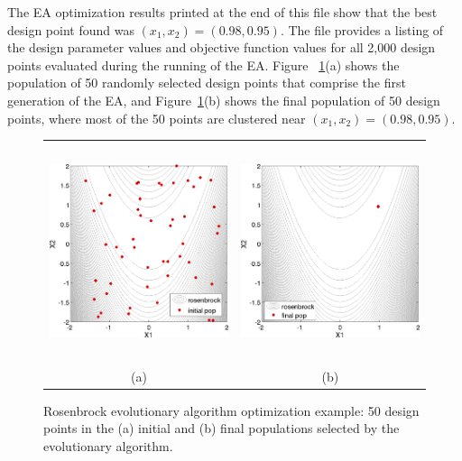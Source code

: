 The EA optimization results printed at the end of this file show that
the best design point found was $(x_1,x_2) = (0.98,0.95)$. The file
 provides a listing of the design
parameter values and objective function values for all 2,000 design
points evaluated during the running of the EA. Figure~
\ref{opt:methods:gradientfree:global:example:rosenbrock_ea_graphics}(a)
shows the population of 50 randomly selected design points that
comprise the first generation of the EA, and
Figure~\ref{opt:methods:gradientfree:global:example:rosenbrock_ea_graphics}(b)
shows the final population of 50 design points, where most of the 50
points are clustered near $(x_1,x_2) = (0.98,0.95)$.

\begin{figure}[hbt!]
  \centering
  \begin{tabular}{cc}
  \includegraphics[height=2.5in]{images/rosen_ea_init} &
  \includegraphics[height=2.5in]{images/rosen_ea_final} \\
  (a) & (b)
  \end{tabular}
  \caption{Rosenbrock evolutionary algorithm optimization example: 50
    design points in the (a) initial and (b) final populations
    selected by the evolutionary algorithm. }
  \label{opt:methods:gradientfree:global:example:rosenbrock_ea_graphics}
\end{figure}

